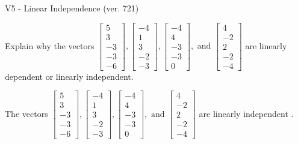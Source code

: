 \begin{exercise}
  \begin{exerciseTitle}V5 - Linear Independence (ver. 721)\end{exerciseTitle}
  \begin{exerciseStatement}
    Explain why the vectors \(\left[\begin{array}{r}
5 \\
3 \\
-3 \\
-3 \\
-6
\end{array}\right] , \left[\begin{array}{r}
-4 \\
1 \\
3 \\
-2 \\
-3
\end{array}\right] , \left[\begin{array}{r}
-4 \\
4 \\
-3 \\
-3 \\
0
\end{array}\right] , \text{ and } \left[\begin{array}{r}
4 \\
-2 \\
2 \\
-2 \\
-4
\end{array}\right]\) are linearly dependent or linearly independent.	


  \end{exerciseStatement}
  \begin{exerciseAnswer}
   The vectors \(\left[\begin{array}{r}
5 \\
3 \\
-3 \\
-3 \\
-6
\end{array}\right] , \left[\begin{array}{r}
-4 \\
1 \\
3 \\
-2 \\
-3
\end{array}\right] , \left[\begin{array}{r}
-4 \\
4 \\
-3 \\
-3 \\
0
\end{array}\right] , \text{ and } \left[\begin{array}{r}
4 \\
-2 \\
2 \\
-2 \\
-4
\end{array}\right]\) are 
  	 linearly independent  .
  


  \end{exerciseAnswer}
\end{exercise}